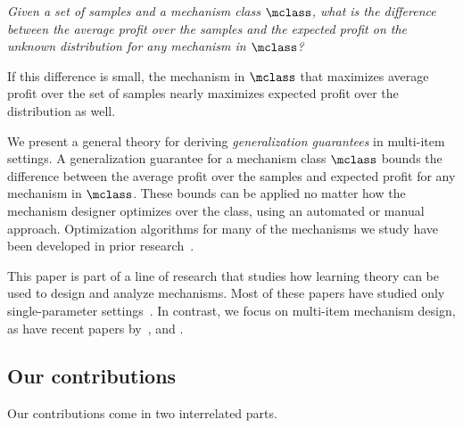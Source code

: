 \smallskip

\noindent\emph{Given a set of samples and a mechanism class $\mclass$, what is the difference between the average profit over the samples and the expected profit on the unknown distribution for any mechanism in $\mclass$?}

\smallskip

\noindent If this difference is small, the mechanism in $\mclass$ that maximizes average profit over the set of samples nearly maximizes expected profit over the distribution as well.


We present a general theory for deriving \emph{generalization guarantees} in multi-item settings.
A generalization guarantee for a mechanism class $\mclass$ bounds the difference between the average profit over the samples and expected profit for any mechanism in $\mclass$.
These bounds can be applied no matter how the mechanism designer optimizes over the class, using an automated or manual approach. Optimization algorithms for many of the mechanisms we study have been developed in prior research~\citep{Sandholm15:Automated,Cai17:Learning,Balcan20:Efficient}. 

This paper is part of a line of research that studies how learning theory can be used to design and analyze mechanisms. Most of these papers have studied only single-parameter settings~\citep{Balcan05:Mechanism,Balcan08:Reducing,Elkind07:Designing,Cole14:Sample, Huang15:Making, Mohri14:Learning, Morgenstern15:Pseudo, Roughgarden15:Ironing,Devanur16:Sample, Hartline16:Non,Gonczarowski17:Efficient,  Bubeck17:Online, Alon17:Submultiplicative, Guo19:Settling}. In contrast, we focus on multi-item mechanism design, as have recent papers by~\citet{Morgenstern16:Learning,Syrgkanis17:Sample, Medina17:Revenue, Cai17:Learning}, and \citet{Gonczarowski18:Sample}.

\subsection{Our contributions}

Our contributions come in two interrelated parts.

